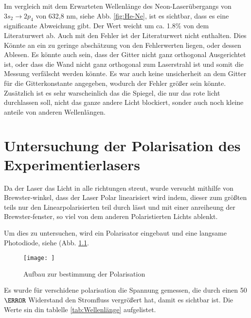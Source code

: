 Im vergleich mit dem Erwarteten Wellenlänge des Neon-Laserübergangs von $3s_2 \rightarrow 2p_4$ von 632,8 nm, siehe Abb. \ref{fig:He-Ne}, ist es sichtbar, dass es eine significante Abweichung gibt. 
Der Wert weicht um ca. 1.8$\%$ von dem Literaturwert ab. 
Auch mit den Fehler ist der Literaturwert nicht enthalten.
Dies Könnte an ein zu geringe abschätzung von den Fehlerwerten liegen, oder dessen Ablesen.
Es könnte auch sein, dass der Gitter nicht ganz orthogonal Ausgerichtet ist, oder dass die Wand nicht ganz orthogonal zum Laserstrahl ist und somit die Messung verfälscht werden könnte. 
Es war auch keine unsicherheit an dem Gitter für die Gitterkonstante angegeben, wodurch der Fehler größer sein könnte. 
Zusätzlich ist es sehr warscheinlich das die Spiegel, die nur das rote licht durchlassen soll, nicht das ganze andere Licht blockiert, sonder auch noch kleine anteile von anderen Wellenlängen.



\chapter{Untersuchung der Polarisation des Experimentierlasers}

Da der Laser das Licht in alle richtungen streut, wurde versucht mithilfe von Brewster-winkel, dass der Laser Polar linearisiert wird indem, dieser zum größten teils nur den Linearpolarisierten teil durch lässt und mit einer anreiheung der Brewster-fenster, so viel von dem anderen Polaristierten Lichts ablenkt. 

Um dies zu untersuchen, wird ein Polarisator eingebaut und eine langsame Photodiode, siehe (Abb. \ref{fig:Polar}.

\begin{figure}
    \centering
    \texttt{[image: ]}
    \caption{Aufbau zur bestimmung der Polarisation}
    \label{fig:Polar}
\end{figure}

Es wurde für verschidene polarisation die Spannung gemessen, die durch einen 50 $ \ohm $ Widerstand den Stromfluss vergrößert hat, damit es sichtbar ist.
Die Werte sin din tablelle \ref{tab:Wellenlänge} aufgelistet.

